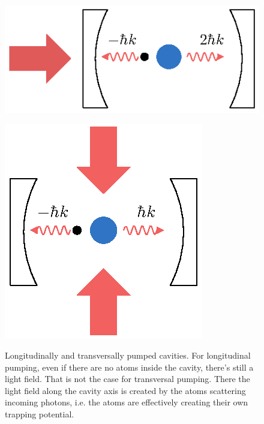 \begin{figure}[!htb]
	\begin{minipage}[b]{.5\linewidth}
	\centering
	\includegraphics[width=.8\linewidth]{images/pump_long.eps}
	\label{longitudinal_pump}
	\end{minipage}
%
	\begin{minipage}[b]{.5\linewidth}
	\centering
	\includegraphics[width=.8\linewidth]{images/pump_trans.eps}
	\label{transversal_pump}
	\end{minipage}
\caption{Longitudinally and transversally pumped cavities. For longitudinal pumping, even if there are no atoms inside the cavity, there's still a light field. That is not the case for transversal pumping. There the light field along the cavity axis is created by the atoms scattering incoming photons, i.e. the atoms are effectively creating their own trapping potential.}
\label{pumping}
\end{figure}
\FloatBarrier

